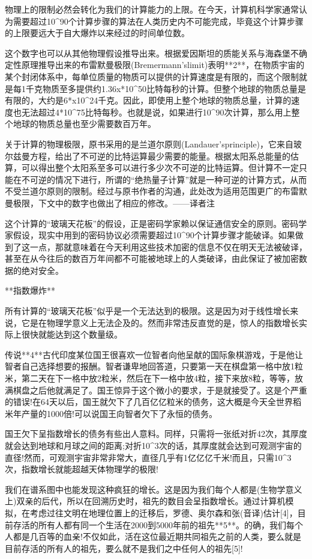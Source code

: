 物理上的限制必然会转化为我们的计算能力的上限。在今天，计算机科学家通常认为需要超过10^90个计算步骤的算法在人类历史内不可能完成，毕竟这个计算步骤的上限要远大于自大爆炸以来经过的时间单位数。

这个数字也可以从其他物理假设推导出来。根据爱因斯坦的质能关系与海森堡不确定性原理推导出来的布雷默曼极限(Bremermann'slimit)表明**2**，在物质宇宙的某个封闭体系中，每单位质量的物质可以提供的计算速度是有限的，而这个限制就是每1千克物质至多提供约1.36x*10^50比特每秒的计算。但整个地球的物质总量是有限的，大约是6*x10^24千克。因此，即使用上整个地球的物质总量，计算的速度也无法超过4*10^75比特每秒。也就是说，如果进行10^90次计算，那么用上整个地球的物质总量也至少需要数百万年。

关于计算的物理极限，原书采用的是兰道尔原则(Landauer'sprinciple)，它来自玻尔兹曼方程，给出了不可逆的比特运算最少需要的能量。根据太阳系总能量的估算，可以得出整个太阳系至多可以进行多少次不可逆的比特运算。但计算不一定只能在不可逆的情况下进行，所谓的“绝热量子计算”就是一种可逆的计算方式，从而不受兰道尔原则的限制。经过与原书作者的沟通，此处改为适用范围更广的布雷默曼极限，下文中的数字也做出了相应的修改。——译者注

这个计算的“玻璃天花板”的假设，正是密码学家赖以保证通信安全的原则。密码学家假设，现实中用到的密码协议必须需要超过10^90个计算步骤才能破译。如果做到了这一点，那就意味着在今天利用这些技术加密的信息不仅在明天无法被破译，甚至在从今往后的数百万年间都不可能被地球上的人类破译，由此保证了被加密数据的绝对安全。

**指数爆炸**

所有计算的“玻璃天花板”似乎是一个无法达到的极限。这是因为对于线性增长来说，它是在物理学意义上无法企及的。然而非常违反直觉的是，惊人的指数增长实际上很快就能达到这个数量级。

传说**4**古代印度某位国王很喜欢一位智者向他呈献的国际象棋游戏，于是他让智者自己选择想要的报酬。智者谦卑地回答道，只要第一天在棋盘第一格中放1粒米，第二天在下一格中放2粒米，然后在下一格中放4粒，接下来放8粒，等等，放满棋盘之后他就满足了。国王惊异于这个微小的要求，于是就接受了。这是个严重的错误!在64天以后，国王就欠下了几百亿亿粒米的债务，这大概是今天全世界稻米年产量的1000倍!可以说国王向智者欠下了永恒的债务。

国王欠下呈指数增长的债务有些出人意料。同样，只需将一张纸对折42次，其厚度就会达到地球和月球之间的距离;对折10^3次的话，其厚度就会达到可观测宇宙的直径!然而，可观测宇宙非常非常大，直径几乎有1亿亿亿千米!而且，只需10^3次，指数增长就能超越天体物理学的极限!

我们在谱系图中也能发现这种疯狂的增长。这是因为我们每个人都是(生物学意义上)双亲的后代，所以在回溯历史时，祖先的数目会呈指数增长。通过计算机模拟，在考虑过往文明在地理位置上的迁移后，罗德、奥尔森和张(音译)估计[4]，目前存活的所有人都有同一个生活在2000到5000年前的祖先**5**。的确，我们每个人都是几百等的血亲!不仅如此，活在这位最近期共同祖先之前的人类，要么就是目前存活的所有人的祖先，要么就不是我们之中任何人的祖先[5]!

